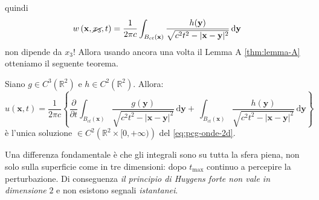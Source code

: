 \documentclass[10pt,a4paper,twoside,openright]{book}
\newcommand{\x}{\mathbf{x}}
\newcommand{\y}{\mathbf{y}}
\newcommand{\de}{\,\mathrm d}
\newcommand{\dyy}{\de \y}
\begin{document}
\FloatBarrier
quindi
\begin{equation*}
	w\left(\x ,\cancel{x_{3}} ,t\right) =\frac{1}{2\pi c}\int _{B_{ct}(\x)}\frac{h(\y)}{\sqrt{c^{2} t^{2} -| \x -\y| ^{2}}} \dyy
\end{equation*}
non dipende da $\displaystyle x_{3}$! Allora usando ancora una volta il Lemma A \ref{thm:lemma-A} otteniamo il seguente teorema.
\begin{theorem}
	 Siano $\displaystyle g\in C^{3}\left(\mathbb{R}^{2}\right)$ e $\displaystyle h\in C^{2}\left(\mathbb{R}^{2}\right)$. Allora:
	\begin{equation}
		u(\x ,t) =\frac{1}{2\pi c}\left\{\frac{\partial }{\partial t}\int _{B_{ct}(\x)}\frac{g(\y)}{\sqrt{c^{2} t^{2} -| \x -\y| ^{2}}} \dyy +\ \int _{B_{ct}(\x)}\frac{h(\y)}{\sqrt{c^{2} t^{2} -| \x -\y| ^{2}}} \dyy\right\}
	\end{equation}
	è l'unica soluzione $\displaystyle \in C^{2}\left(\mathbb{R}^{2} \times [ 0,+\infty)\right)$ del \eqref{eq:pcg-onde-2d}.
\end{theorem}
Una differenza fondamentale è che gli integrali sono su tutta la sfera piena, non solo sulla superficie come in tre dimensioni: dopo $\displaystyle t_{\max}$ continuo a percepire la perturbazione. Di conseguenza \textit{il principio di Huygens forte non vale in dimensione }$2$ e non esistono segnali \textit{istantanei}.
\end{document}
